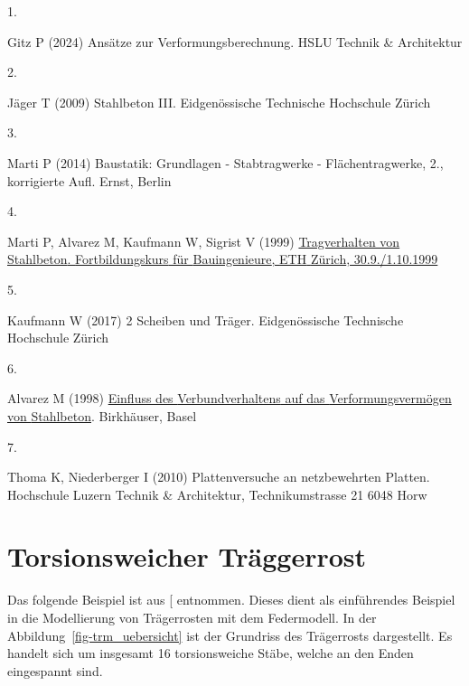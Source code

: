 \documentclass[
  11pt,
  letterpaper,
]{scrreprt}
\newlength{\cslhangindent}
\newlength{\csllabelwidth}
\newenvironment{CSLReferences}[2] %
 {\begin{list}{}{%
  \setlength{\itemindent}{0pt}
  \setlength{\leftmargin}{0pt}
  \setlength{\parsep}{0pt}
  \ifodd #1
   \setlength{\leftmargin}{\cslhangindent}
   \setlength{\itemindent}{-1\cslhangindent}
  \fi
  \setlength{\itemsep}{#2\baselineskip}}}
 {\end{list}}
\newcommand{\CSLLeftMargin}[1]{\parbox[t]{\csllabelwidth}{\strut#1\strut}}
\newcommand{\CSLRightInline}[1]{\parbox[t]{\linewidth - \csllabelwidth}{\strut#1\strut}}
\begin{document}
\label{refs}
\begin{CSLReferences}{0}{1}
\CSLLeftMargin{1. }%
\CSLRightInline{Gitz P (2024) Ansätze zur {Verformungsberechnung}. HSLU
Technik \& Architektur}

\CSLLeftMargin{2. }%
\CSLRightInline{Jäger T (2009) Stahlbeton {III}. Eidgenössische
Technische Hochschule Zürich}

\CSLLeftMargin{3. }%
\CSLRightInline{Marti P (2014) Baustatik: {Grundlagen} - {Stabtragwerke}
- {Flächentragwerke}, 2., korrigierte Aufl. Ernst, Berlin}

\CSLLeftMargin{4. }%
\CSLRightInline{Marti P, Alvarez M, Kaufmann W, Sigrist V (1999)
\href{https://doi.org/10.3929/ethz-a-004470343}{Tragverhalten von
{Stahlbeton}. {Fortbildungskurs} für {Bauingenieure}, {ETH} {Zürich},
30.9./1.10.1999}}

\CSLLeftMargin{5. }%
\CSLRightInline{Kaufmann W (2017) 2 {Scheiben} und {Träger}.
Eidgenössische Technische Hochschule Zürich}

\CSLLeftMargin{6. }%
\CSLRightInline{Alvarez M (1998)
\href{https://doi.org/10.3929/ethz-a-002000033}{Einfluss des
{Verbundverhaltens} auf das {Verformungsvermögen} von {Stahlbeton}}.
Birkhäuser, Basel}

\CSLLeftMargin{7. }%
\CSLRightInline{Thoma K, Niederberger I (2010) Plattenversuche an
netzbewehrten {Platten}. Hochschule Luzern Technik \& Architektur,
Technikumstrasse 21 6048 Horw}

\end{CSLReferences}

\cleardoublepage
{}
{}
\appendix

\chapter{Torsionsweicher
Träggerrost}\label{torsionsweicher-truxe4ggerrost}

Das folgende Beispiel ist aus
{[}\citeproc{ref-marti_baustatik_2014}{3}{]} entnommen. Dieses dient als
einführendes Beispiel in die Modellierung von Trägerrosten mit dem
Federmodell. In der Abbildung~\ref{fig-trm_uebersicht} ist der Grundriss
des Trägerrosts dargestellt. Es handelt sich um insgesamt 16
torsionsweiche Stäbe, welche an den Enden eingespannt sind.
\end{document}
